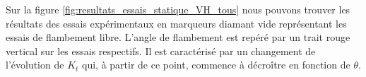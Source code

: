 \begin{table}[!htbp]
	\centering
	\captionsetup{justification=centering}
	\caption{Dimensions des tubes testés sur le banc expérimental statique}
	\label{tab:dim_tube_statique}
\end{table}    

Sur la figure \ref{fig:resultats_essais_statique_VH_tous} nous pouvons trouver les résultats des essais expérimentaux en marqueurs diamant vide représentant les essais de flambement libre. L'angle de flambement est repéré par un trait rouge vertical sur les essais respectifs. Il est caractérisé par un changement de l'évolution de $K_t$ qui, à partir de ce point, commence à décroître en fonction de $\theta$.


